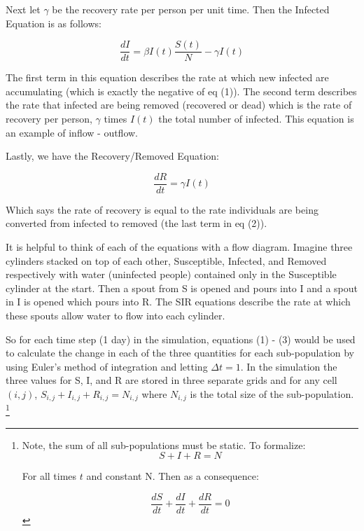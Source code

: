 \documentclass[a4paper]{article}
\begin{document}
Next let $\gamma$ be the recovery rate per person per unit time. Then the
Infected Equation is as follows:

\begin{equation}
  \frac{dI}{dt} = \beta I(t) \frac{S(t)}{N} - \gamma I(t)
\end{equation}

The first term in this equation describes the rate at which new infected are
accumulating (which is exactly the negative of eq (1)). The second term
describes the rate that infected are being removed (recovered or dead) which
is the rate of recovery per person, $\gamma$ times $I(t)$ the total number of
infected. This equation is an example of inflow - outflow.

Lastly, we have the Recovery/Removed Equation: 

\begin{equation}
  \frac{dR}{dt} = \gamma I(t)
\end{equation}

Which says the rate of recovery is equal to the rate individuals are being
converted from infected to removed (the last term in eq (2)).

It is helpful to think of each of the equations with a flow diagram. Imagine
three cylinders stacked on top of each other, Susceptible, Infected, and Removed
respectively with water (uninfected people) contained only in the Susceptible cylinder 
at the start. Then a spout from S is opened and pours into I and a spout in I is opened
which pours into R. The SIR equations describe the rate at which these spouts allow 
water to flow into each cylinder.

So for each time step (1 day) in the simulation, equations (1) - (3) would be
used to calculate the change in each of the three quantities for each sub-population 
by using Euler's method of integration and letting $\Delta t=1$. In the simulation the
three values for S, I, and R are stored in three separate grids and for any cell
${(i,j)}$, $S_{i,j} + I_{i,j} + R_{i,j} = N_{i,j}$ where $N_{i,j}$ is the total
size of the sub-population. \footnote {
Note, the sum of all sub-populations must be
static. To formalize:\begin{equation*}
  S + I + R = N
\end{equation*}

For all times $t$ and constant N. Then as a consequence:

\begin{equation*}
  \frac{dS}{dt} + \frac{dI}{dt} + \frac{dR}{dt}  = 0
\end{equation*}
}
\end{document}
